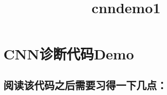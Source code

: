 \documentclass[11pt]{article}
\title{cnndemo1}
\begin{document}
    
    
    \maketitle
    
    

    
    \section{CNN诊断代码Demo}\label{cnnux8bcaux65adux4ee3ux7801demo}

\subsection{阅读该代码之后需要习得一下几点：}\label{ux9605ux8bfbux8be5ux4ee3ux7801ux4e4bux540eux9700ux8981ux4e60ux5f97ux4e00ux4e0bux51e0ux70b9}
\end{document}
